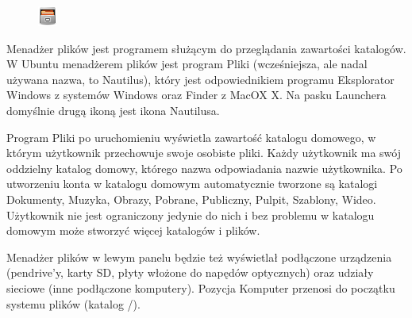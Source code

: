 \begin{figure}
	\vspace{-10pt}
	\includegraphics[width=\linewidth]{images/ikony_pliki.png}
\end{figure}

Menadżer plików jest programem służącym do przeglądania zawartości katalogów. W Ubuntu menadżerem plików jest program  \textcolor{ubuntu_orange}{Pliki} (wcześniejsza, ale nadal używana nazwa, to \textcolor{ubuntu_orange}{Nautilus}), który jest odpowiednikiem programu \textcolor{ubuntu_orange}{Eksplorator Windows} z systemów Windows oraz \textcolor{ubuntu_orange}{Finder} z MacOX X. Na pasku Launchera domyślnie drugą ikoną jest ikona Nautilusa. 

Program Pliki po uruchomieniu wyświetla zawartość katalogu domowego, w którym użytkownik przechowuje swoje osobiste pliki. Każdy użytkownik ma swój oddzielny katalog domowy, którego nazwa odpowiadania nazwie użytkownika. Po utworzeniu konta w katalogu domowym automatycznie tworzone są katalogi Dokumenty, Muzyka, Obrazy, Pobrane, Publiczny, Pulpit, Szablony, Wideo. Użytkownik nie jest ograniczony jedynie do nich i bez problemu w katalogu domowym może stworzyć więcej katalogów i plików.

Menadżer plików w lewym panelu będzie też wyświetlał podłączone urządzenia (pendrive'y, karty SD, płyty włożone do napędów optycznych) oraz udziały sieciowe (inne podłączone komputery). Pozycja \textcolor{ubuntu_orange}{Komputer} przenosi do początku systemu plików (katalog /).

